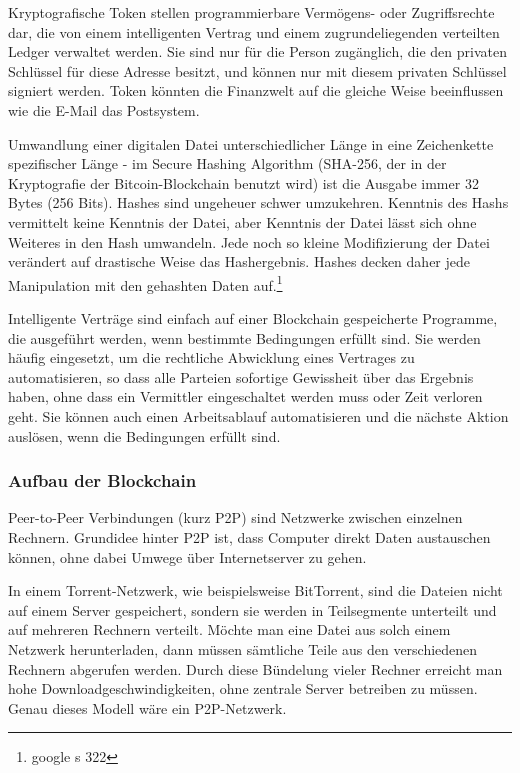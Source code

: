 Kryptografische Token stellen programmierbare Vermögens- oder Zugriffsrechte dar, die von einem intelligenten Vertrag und einem zugrundeliegenden verteilten Ledger verwaltet werden. 
Sie sind nur für die Person zugänglich, die den privaten Schlüssel für diese Adresse besitzt, und können nur mit diesem privaten Schlüssel signiert werden. 
Token  könnten  die  Finanzwelt  auf  die  gleiche  Weise  beeinflussen  wie  die  E-Mail  das Postsystem.

Umwandlung einer digitalen Datei unterschiedlicher Länge in
eine Zeichenkette spezifischer Länge - im Secure Hashing Algorithm
(SHA-256, der in der Kryptografie der Bitcoin-Blockchain benutzt wird)
ist die Ausgabe immer 32 Bytes (256 Bits). Hashes sind ungeheuer schwer
umzukehren. Kenntnis des Hashs vermittelt keine Kenntnis der Datei,
aber Kenntnis der Datei lässt sich ohne Weiteres in den Hash umwandeln.
Jede noch so kleine Modifizierung der Datei verändert auf drastische Weise das Hashergebnis.
Hashes decken daher jede Manipulation mit den gehashten Daten auf.\footnote{google s 322}

Intelligente Verträge sind einfach auf einer Blockchain gespeicherte Programme, die ausgeführt werden, wenn bestimmte Bedingungen erfüllt sind. 
Sie werden häufig eingesetzt, um die rechtliche Abwicklung eines Vertrages zu automatisieren, so dass alle Parteien sofortige Gewissheit über das Ergebnis haben, ohne dass ein Vermittler eingeschaltet werden muss oder Zeit verloren geht. 
Sie können auch einen Arbeitsablauf automatisieren und die nächste Aktion auslösen, wenn die Bedingungen erfüllt sind.

\subsubsection{Aufbau der Blockchain}

Peer-to-Peer Verbindungen (kurz P2P) sind Netzwerke zwischen einzelnen Rechnern. Grundidee hinter P2P ist, dass Computer direkt Daten austauschen können, ohne dabei Umwege über Internetserver zu gehen.

In einem Torrent-Netzwerk, wie beispielsweise BitTorrent, sind die Dateien nicht auf einem Server gespeichert, sondern sie werden in Teilsegmente unterteilt und auf mehreren Rechnern verteilt. 
Möchte man eine Datei aus solch einem Netzwerk herunterladen, dann müssen sämtliche Teile aus den verschiedenen Rechnern abgerufen werden. 
Durch diese Bündelung vieler Rechner erreicht man hohe Downloadgeschwindigkeiten, ohne zentrale Server betreiben zu müssen. 
Genau dieses Modell wäre ein P2P-Netzwerk.

